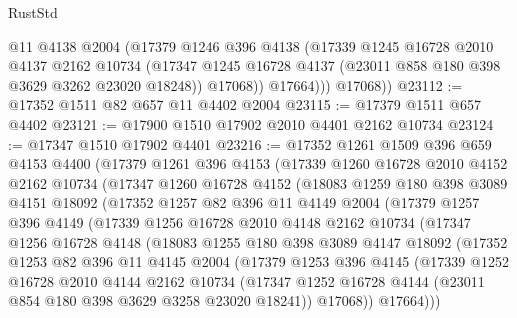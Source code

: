 \begin{lexlean}{RustStd}
\begin{coremodule}
              @11
              @4138
              @2004
              (@17379
                @1246
                @396
                @4138
                (@17339
                  @1245
                  @16728
                  @2010
                  @4137
                  @2162
                  @10734
                  (@17347 @1245 @16728 @4137 (@23011 @858 @180 @398 @3629 @3262 @23020 @18248))
                  @17068))
              @17664)))
        @17068))
@23112 := @17352 @1511 @82 @657 @11 @4402 @2004
@23115 := @17379 @1511 @657 @4402
@23121 := @17900 @1510 @17902 @2010 @4401 @2162 @10734
@23124 := @17347 @1510 @17902 @4401
@23216 := @17352
    @1261
    @1509
    @396
    @659
    @4153
    @4400
    (@17379
      @1261
      @396
      @4153
      (@17339
        @1260
        @16728
        @2010
        @4152
        @2162
        @10734
        (@17347
          @1260
          @16728
          @4152
          (@18083
            @1259
            @180
            @398
            @3089
            @4151
            @18092
            (@17352
              @1257
              @82
              @396
              @11
              @4149
              @2004
              (@17379
                @1257
                @396
                @4149
                (@17339
                  @1256
                  @16728
                  @2010
                  @4148
                  @2162
                  @10734
                  (@17347
                    @1256
                    @16728
                    @4148
                    (@18083
                      @1255
                      @180
                      @398
                      @3089
                      @4147
                      @18092
                      (@17352
                        @1253
                        @82
                        @396
                        @11
                        @4145
                        @2004
                        (@17379
                          @1253
                          @396
                          @4145
                          (@17339
                            @1252
                            @16728
                            @2010
                            @4144
                            @2162
                            @10734
                            (@17347
                              @1252
                              @16728
                              @4144
                              (@23011 @854 @180 @398 @3629 @3258 @23020 @18241))
                            @17068))
                        @17664)))

\end{coremodule}
\end{lexlean}
